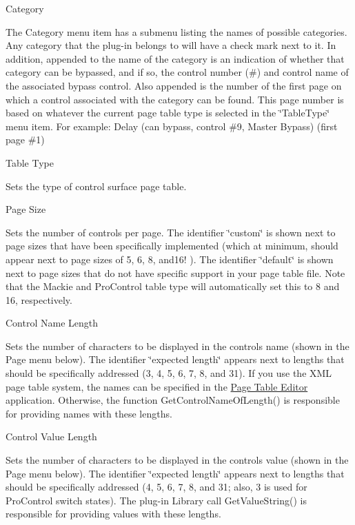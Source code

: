 \begin{DoxyItemize}
\item  Category 

The Category menu item has a submenu listing the names of possible categories. Any category that the plug-\/in belongs to will have a check mark next to it. In addition, appended to the name of the category is an indication of whether that category can be bypassed, and if so, the control number (\#) and control name of the associated bypass control. Also appended is the number of the first page on which a control associated with the category can be found. This page number is based on whatever the current page table type is selected in the \char`\"{}\+Table\+Type\char`\"{} menu item. For example\+: Delay (can bypass, control \#9, Master Bypass) (first page \#1)


\item  Table Type 

Sets the type of control surface page table.


\item  Page Size 

Sets the number of controls per page. The identifier \char`\"{}custom\char`\"{} is shown next to page sizes that have been specifically implemented (which at minimum, should appear next to page sizes of 5, 6, 8, and16! ). The identifier \char`\"{}default\char`\"{} is shown next to page sizes that do not have specific support in your page table file. Note that the Mackie and Pro\+Control table type will automatically set this to 8 and 16, respectively.


\item  Control Name Length 

Sets the number of characters to be displayed in the control\textquotesingle{}s name (shown in the Page menu below). The identifier \char`\"{}expected length\char`\"{} appears next to lengths that should be specifically addressed (3, 4, 5, 6, 7, 8, and 31). If you use the X\+M\+L page table system, the names can be specified in the \hyperlink{a00363_subsection_creating_page_tables_in_pete}{Page Table Editor} application. Otherwise, the function Get\+Control\+Name\+Of\+Length() is responsible for providing names with these lengths.


\item  Control Value Length 

Sets the number of characters to be displayed in the control\textquotesingle{}s value (shown in the Page menu below). The identifier \char`\"{}expected length\char`\"{} appears next to lengths that should be specifically addressed (4, 5, 6, 7, 8, and 31; also, 3 is used for Pro\+Control switch states). The plug-\/in Library call Get\+Value\+String() is responsible for providing values with these lengths.



\end{DoxyItemize}
